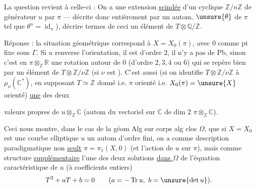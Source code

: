 La question revient à celle-ci : On a une extension \uline{scindée}
d'un  cyclique
\(\mathbb Z/n\mathbb Z\) de générateur \(u\) par \(\pi\)
--- décrite donc entièrement par un autom.
 \(\unsure{\theta}\) de \(\pi\) tel que
\(\theta^n=\operatorname{id}_\pi\)), décrire  termes de
ceci un élément de \(T\otimes\mathbb Q/\mathbb Z\).

Réponse : la situation géométrique 
correspond à \(X=X_0(\pi)\), avec \(0\) comme pt fixe sous \(\Gamma\).
Si \(u\) renverse l'orientation, il est d'ordre  \(2\),
il n'y a pas de Pb, sinon c'est  en
\(\pi\otimes_{\mathbb Z}\mathbb R\) une rotation autour de \(0\)
(d'ordre \(2,3,4\) ou \(6\)) qui se repère bien par un élément
de  \(T\otimes\mathbb Z/\nu\mathbb Z\)
(si \(\nu\) est ).
C'est aussi (si on identifie
\(T\otimes\mathbb Z/\nu\mathbb Z\) à
\(\mu_\nu(\mathbb C^*)\), en supposant
\(T\simeq\mathbb Z\) donné
i.e. \(\pi\) orienté i.e. \(X_0(\pi)=\unsure{X}\)
orienté) \uline{une} des deux



valeurs propres de \(u\otimes_{\mathbb Z}\mathbb C\)
(autom du vectoriel sur \(\mathbb C\) de dim \(2\)
\(\pi\otimes_{\mathbb Z}\mathbb C\)).

Ceci nous montre, dans le cas de la géom Alg sur corps alg clos
\(\Omega\), que si \(X=X_0\) est une courbe elliptique
\(u\) un autom d'ordre fini, on a comme description
paradigmatique non \uline{seult}
\(\pi=\pi_1(X,0)\)
(et l'action de \(u\) sur \(\pi\)), mais comme structure
\uline{supplémentaire} l'une des deux solutions \uline{dans \(\Omega\)}
de l'équation caractéristique de \(u\) (à coefficients entiers)
\[
T^2+aT+b=0
\qquad (a=-\operatorname{Tr}u,\ b=\unsure{\det u}).
\]

